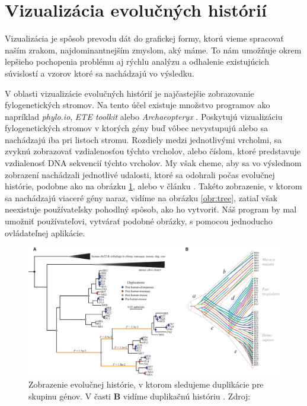 \section{Vizualizácia evolučných histórií}
Vizualizácia je spôsob prevodu dát do grafickej formy, ktorú vieme spracovať naším zrakom, najdominantnejším zmyslom, aký máme.
To nám umožňuje okrem lepšieho pochopenia problému aj rýchlu analýzu a odhalenie existujúcich súvislostí a vzorov ktoré sa nachádzajú vo výsledku.

V oblasti  vizualizácie evolučných histórií je najčastejšie zobrazovanie fylogenetických stromov.
Na tento účel existuje množstvo programov  ako napríklad \emph{phylo.io}, \emph{ETE toolkit} alebo \emph{Archaeopteryx} \cite{Robinson_2016,Huerta-Cepas2010,archa}.
Poskytujú vizualizáciu fylogenetických stromov v ktorých gény buď vôbec nevystupujú alebo sa nachádzajú iba pri listoch stromu.
Rozdiely medzi jednotlivými vrcholmi, sa zvyknú zobrazovať vzdialenosťou týchto vrcholov, alebo číslom, ktoré predstavuje vzdialenosť DNA sekvencií týchto vrcholov. 
My však cheme, aby sa vo výslednom zobrazení nachádzali jednotlivé udalosti, ktoré sa odohrali počas evolučnej histórie, podobne ako na obrázku \ref{obr:genetree},
alebo v článku \cite{gorecki2011maximum}. Takéto zobrazenie, v ktorom sa nachádzajú viaceré gény naraz, vidíme na obrázku \ref{obr:tree}, 
zatiaľ však neexistuje používateľsky pohodlný spôsob, ako ho vytvoriť.
Náš program by mal umožniť používateľovi, vytvárať podobné obrázky, s pomocou jednoducho ovládateľnej aplikácie.
\begin{figure}[t]
 \centering
\includegraphics[width=1\textwidth]{images/genetree}
\caption{Zobrazenie evolučnej histórie, v ktorom sledujeme duplikácie pre skupinu génov. V časti \textbf{B} vidíme duplikačnú históriu . Zdroj: \cite{222}}\label{obr:genetree}
\end{figure}

